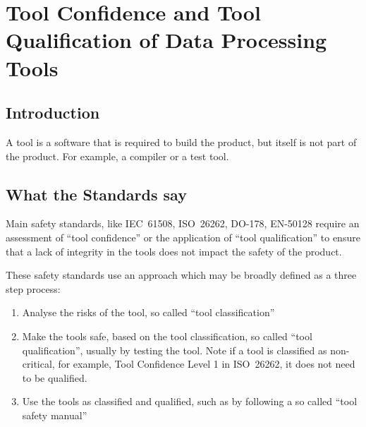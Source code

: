 %
\chapter{Tool Confidence and Tool Qualification of Data Processing Tools}\label{bkm:tools}
%

\section{Introduction}
A tool is a software that is required to build the product, but itself is not part of the product. For example, a compiler or a test tool.

\section{What the Standards say}
Main safety standards, like IEC\ 61508, ISO\ 26262, DO-178, EN-50128 require an assessment of ``tool confidence''
or the application of ``tool qualification'' to ensure that a lack of \gls{integrity} in the tools does not impact  the safety of the product. 

These safety standards use an approach which may be broadly defined as a three step process:

\begin{enumerate}
     \item Analyse the risks of the tool, so called ``tool classification''
     \item Make the tools safe, based on the tool classification, so called ``tool qualification'', usually by testing the tool.
       Note if a tool is classified as non-critical, for example, Tool Confidence Level 1 in ISO\ 26262, it does not need to be qualified.
     \item Use the tools as classified and qualified, such as by following a so called ``tool safety manual''
\end{enumerate}
 
